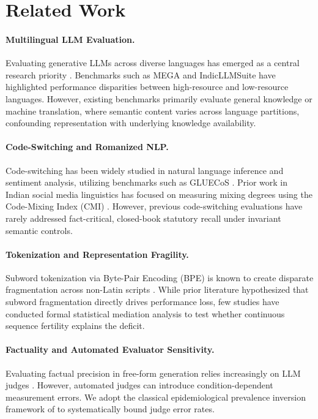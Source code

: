 \documentclass[11pt]{article}
\begin{document}
\section{Related Work}
\label{sec:related_work}

\paragraph{Multilingual LLM Evaluation.}
Evaluating generative LLMs across diverse languages has emerged as a central research priority \citep{conneau2020unsupervised,kakwani2020indicnlpsuite}. Benchmarks such as MEGA \citep{ahuja2023mega} and IndicLLMSuite \citep{doddapaneni2023indicllmsuite} have highlighted performance disparities between high-resource and low-resource languages. However, existing benchmarks primarily evaluate general knowledge or machine translation, where semantic content varies across language partitions, confounding representation with underlying knowledge availability.

\paragraph{Code-Switching and Romanized NLP.}
Code-switching has been widely studied in natural language inference and sentiment analysis, utilizing benchmarks such as GLUECoS \citep{khanuja2020gluecos}. Prior work in Indian social media linguistics \citep{bali2014borrowin,sitaram2019survey} has focused on measuring mixing degrees using the Code-Mixing Index (CMI) \citep{gamback2014comparing}. However, previous code-switching evaluations have rarely addressed fact-critical, closed-book statutory recall under invariant semantic controls.

\paragraph{Tokenization and Representation Fragility.}
Subword tokenization via Byte-Pair Encoding (BPE) \citep{sennrich2016neural} is known to create disparate fragmentation across non-Latin scripts \citep{rust2021good,petrov2023language}. While prior literature hypothesized that subword fragmentation directly drives performance loss, few studies have conducted formal statistical mediation analysis to test whether continuous sequence fertility explains the deficit.

\paragraph{Factuality and Automated Evaluator Sensitivity.}
Evaluating factual precision in free-form generation relies increasingly on LLM judges \citep{lin2022truthfulqa,min2023factscore,zheng2023judging}. However, automated judges can introduce condition-dependent measurement errors. We adopt the classical epidemiological prevalence inversion framework of \citet{rogan1978estimating} to systematically bound judge error rates.
\end{document}
